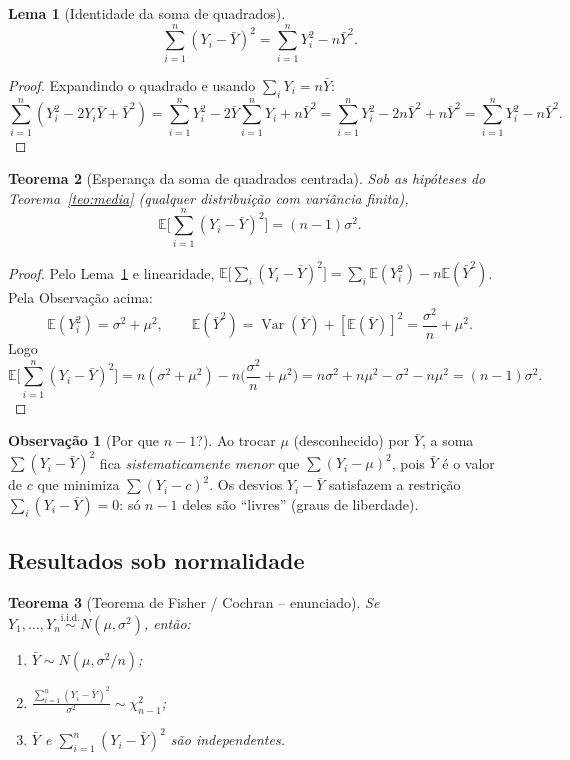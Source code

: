 \documentclass[11pt,a4paper]{article}
\theoremstyle{definition}
\newtheorem{observacao}{Observação}[section]
\theoremstyle{plain}
\newtheorem{teorema}{Teorema}[section]
\newtheorem{lema}[teorema]{Lema}
\newcommand{\E}{\mathbb{E}}
\newcommand{\Var}{\operatorname{Var}}
\newcommand{\iid}{\overset{\text{i.i.d.}}{\sim}}
\newcommand{\bY}{\bar{Y}}
\begin{document}
\begin{lema}[Identidade da soma de quadrados]\label{lema:sq}
\[
\sum_{i=1}^n (Y_i-\bY)^2 = \sum_{i=1}^n Y_i^2 - n\bY^2.
\]
\end{lema}
\begin{proof}
Expandindo o quadrado e usando $\sum_i Y_i = n\bY$:
\[
\sum_{i=1}^n (Y_i^2 - 2Y_i\bY + \bY^2)
= \sum_{i=1}^n Y_i^2 - 2\bY\sum_{i=1}^n Y_i + n\bY^2
= \sum_{i=1}^n Y_i^2 - 2n\bY^2 + n\bY^2
= \sum_{i=1}^n Y_i^2 - n\bY^2 .
\]
\end{proof}

\begin{teorema}[Esperança da soma de quadrados centrada]\label{teo:sq}
Sob as hipóteses do Teorema~\ref{teo:media} (qualquer distribuição com variância finita),
\[
\E\Big[\sum_{i=1}^n (Y_i-\bY)^2\Big] = (n-1)\sigma^2 .
\]
\end{teorema}
\begin{proof}
Pelo Lema~\ref{lema:sq} e linearidade,
$\E\big[\sum_i (Y_i-\bY)^2\big] = \sum_i \E(Y_i^2) - n\E(\bY^2)$.
Pela Observação acima:
\[
\E(Y_i^2)=\sigma^2+\mu^2,
\qquad
\E(\bY^2)=\Var(\bY)+[\E(\bY)]^2=\frac{\sigma^2}{n}+\mu^2 .
\]
Logo
\[
\E\Big[\sum_{i=1}^n (Y_i-\bY)^2\Big]
= n(\sigma^2+\mu^2) - n\Big(\frac{\sigma^2}{n}+\mu^2\Big)
= n\sigma^2 + n\mu^2 - \sigma^2 - n\mu^2
= (n-1)\sigma^2 .
\]
\end{proof}

\begin{observacao}[Por que $n-1$?]
Ao trocar $\mu$ (desconhecido) por $\bY$, a soma $\sum(Y_i-\bY)^2$ fica \emph{sistematicamente menor} que $\sum(Y_i-\mu)^2$, pois $\bY$ é o valor de $c$ que minimiza $\sum(Y_i-c)^2$. Os desvios $Y_i-\bY$ satisfazem a restrição $\sum_i(Y_i-\bY)=0$: só $n-1$ deles são ``livres'' (graus de liberdade).
\end{observacao}

\subsection{Resultados sob normalidade}

\begin{teorema}[Teorema de Fisher / Cochran -- enunciado]\label{teo:fisher}
Se $Y_1,\dots,Y_n \iid N(\mu,\sigma^2)$, então:
\begin{enumerate}[label=(\roman*)]
\item $\bY \sim N(\mu,\sigma^2/n)$;
\item $\displaystyle \frac{\sum_{i=1}^n (Y_i-\bY)^2}{\sigma^2} \sim \chi^2_{n-1}$;
\item $\bY$ e $\sum_{i=1}^n (Y_i-\bY)^2$ são independentes.
\end{enumerate}
\end{teorema}
\end{document}
